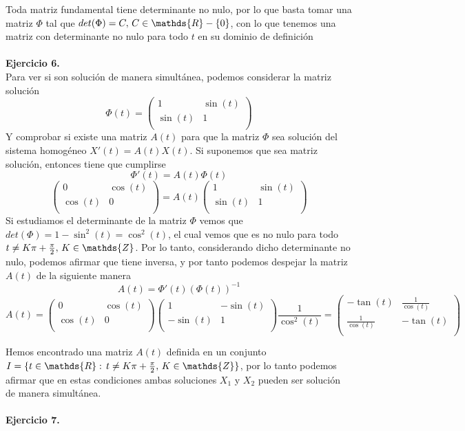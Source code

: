\documentclass[fleqn]{article}
\def\R{\mathds{R}}
\def\Z{\mathds{Z}}
\begin{document}
    
    
    Toda matriz fundamental tiene determinante no nulo, por lo que basta tomar una matriz $\Phi$ tal que $det(\Phi) = C, \thinspace C \in \R-\{0\}$,
    con lo que tenemos una matriz con determinante no nulo para todo $t$ en su dominio de definición\\ \\

    \textbf{Ejercicio 6. } \\

    Para ver si son solución de manera simultánea, podemos considerar la matriz solución 
    $$\Phi (t) = \begin{pmatrix}
        1 & \sin(t)\\
        \sin(t) & 1\\
    \end{pmatrix}$$
    Y comprobar si existe una matriz $A(t)$ para que la matriz $\Phi$ sea solución del sistema homogéneo $X'(t) = A(t) X(t)$. Si suponemos que sea matriz solución,
    entonces tiene que cumplirse
    $$\Phi' (t) = A(t) \Phi(t)$$
    $$
    \begin{pmatrix}
        0 & \cos(t)\\
        \cos(t) & 0\\
    \end{pmatrix} 
    = A(t)
    \begin{pmatrix}
        1 & \sin(t)\\
        \sin(t) & 1\\
    \end{pmatrix}
    $$
    Si estudiamos el determinante de la matriz $\Phi$ vemos que $det(\Phi)=1-\sin^2(t)=\cos^2(t)$, el cual vemos que es no nulo para todo 
    $t\neq K\pi + \frac{\pi}{2}, \thinspace K\in\Z$. Por lo tanto, considerando dicho determinante no nulo, podemos afirmar que tiene inversa, y por tanto 
    podemos despejar la matriz $A(t)$ de la siguiente manera
    $$A(t) = \Phi' (t) (\Phi(t))^{-1}$$
    $$A(t) = 
    \begin{pmatrix}
        0 & \cos(t)\\
        \cos(t) & 0\\
    \end{pmatrix} 
    \begin{pmatrix}
        1 & -\sin(t)\\
        -\sin(t) & 1\\
    \end{pmatrix}
    \frac{1}{\cos^2(t)} = 
    \begin{pmatrix}
        -\tan(t) & \frac{1}{\cos(t)}\\
        \frac{1}{\cos(t)} & -\tan(t)\\
    \end{pmatrix}
    $$

    Hemos encontrado una matriz $A(t)$ definida en un conjunto $I=\{t\in \R: \thinspace t\neq K\pi + \frac{\pi}{2}, \thinspace K\in\Z\}$, por lo tanto podemos afirmar 
    que en estas condiciones ambas soluciones $X_1$ y $X_2$ pueden ser solución de manera simultánea.\\ \\

    \textbf{Ejercicio 7. } \\


    
\end{document}
